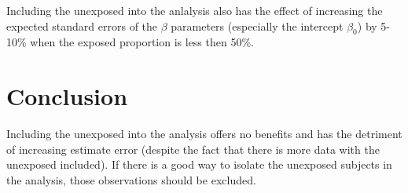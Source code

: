 \documentclass[
]{article}
\begin{document}
Including the unexposed into the anlalysis also has the effect of increasing the expected standard errors of the \(\beta\) parameters (especially the intercept \(\beta_0\)) by 5-10\% when the exposed proportion is less then 50\%.

\hypertarget{conclusion}{%
\section{Conclusion}\label{conclusion}}

Including the unexposed into the analysis offers no benefits and has the detriment of increasing estimate error (despite the fact that there is more data with the unexposed included). If there is a good way to isolate the unexposed subjects in the analysis, those observations should be excluded.
\end{document}
